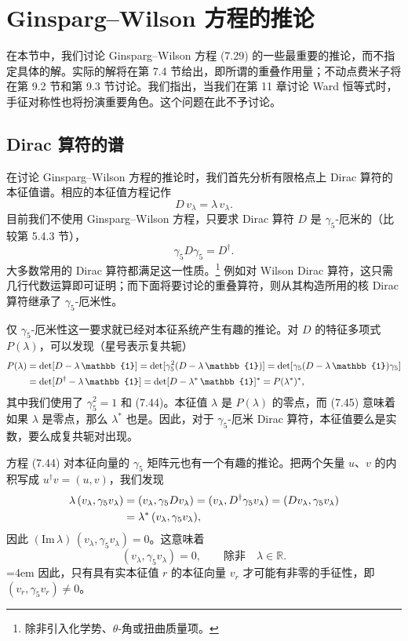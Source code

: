 \section{Ginsparg--Wilson 方程的推论}

在本节中，我们讨论 Ginsparg--Wilson 方程 (7.29) 的一些最重要的推论，而不指定具体的解。实际的解将在第 7.4 节给出，即所谓的重叠作用量；不动点费米子将在第 9.2 节和第 9.3 节讨论。我们指出，当我们在第 11 章讨论 Ward 恒等式时，手征对称性也将扮演重要角色。这个问题在此不予讨论。

\subsection{Dirac 算符的谱}

在讨论 Ginsparg--Wilson 方程的推论时，我们首先分析有限格点上 Dirac 算符的本征值谱。相应的本征值方程记作
\begin{equation}
  D\,v_\lambda = \lambda\,v_\lambda .
\end{equation}
目前我们不使用 Ginsparg--Wilson 方程，只要求 Dirac 算符 $D$ 是 $\gamma_5$-厄米的（比较第 5.4.3 节），
\begin{equation}
  \gamma_5 D\gamma_5 = D^\dagger .
\end{equation}
大多数常用的 Dirac 算符都满足这一性质。\footnote{除非引入化学势、$\theta$-角或扭曲质量项。} 例如对 Wilson Dirac 算符，这只需几行代数运算即可证明；而下面将要讨论的重叠算符，则从其构造所用的核 Dirac 算符继承了 $\gamma_5$-厄米性。

仅 $\gamma_5$-厄米性这一要求就已经对本征系统产生有趣的推论。对 $D$ 的特征多项式 $P(\lambda)$，可以发现（星号表示复共轭）
\begin{align}
  P(\lambda) &= \det[D - \lambda\,\mathbb{1}]
  = \det[\gamma_5^2(D-\lambda\,\mathbb{1})]
  = \det[\gamma_5(D-\lambda\,\mathbb{1})\gamma_5] \notag\\
  &= \det[D^\dagger - \lambda\,\mathbb{1}]
  = \det[D - \lambda^*\,\mathbb{1}]^*
  = P(\lambda^*)^*,
\end{align}
其中我们使用了 $\gamma_5^2 = 1$ 和 (7.44)。本征值 $\lambda$ 是 $P(\lambda)$ 的零点，而 (7.45) 意味着如果 $\lambda$ 是零点，那么 $\lambda^*$ 也是。因此，对于 $\gamma_5$-厄米 Dirac 算符，本征值要么是实数，要么成复共轭对出现。

方程 (7.44) 对本征向量的 $\gamma_5$ 矩阵元也有一个有趣的推论。把两个矢量 $u$、$v$ 的内积写成 $u^\dagger v = (u, v)$，我们发现
\begin{align}
  \lambda\,(v_\lambda, \gamma_5 v_\lambda)
  &= (v_\lambda, \gamma_5 D v_\lambda)
  = (v_\lambda, D^\dagger\gamma_5 v_\lambda)
  = (D v_\lambda, \gamma_5 v_\lambda) \notag\\
  &= \lambda^*\,(v_\lambda, \gamma_5 v_\lambda),
\end{align}
因此 $(\mathrm{Im}\,\lambda)\,(v_\lambda, \gamma_5 v_\lambda) = 0$。这意味着
\begin{equation}
  (v_\lambda, \gamma_5 v_\lambda) = 0, \qquad \text{除非} \quad \lambda \in \mathbb{R} .
\end{equation}
\begingroup\emergencystretch=4em 因此，只有具有实本征值 $r$ 的本征向量 $v_r$ 才可能有非零的手征性，即\linebreak[0] $(v_r, \gamma_5 v_r) \neq 0$。\par\endgroup

